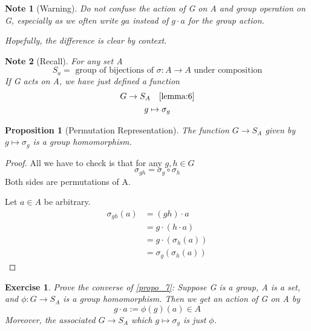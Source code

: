 \documentclass[11pt, oneside]{book}
\theoremstyle{break}
\newtheorem*{proof}{Proof}
\newtheorem{propo}{Proposition}[section]
\newtheorem*{note}{Note}
\newtheorem{ex}{Exercise}[section]
\begin{document}
\begin{note}[Warning]
    Do not confuse the action of G on A and group operation on G, especially as we often write $ga$ instead of $g \cdot a$ for the group action.

    Hopefully, the difference is clear by context.
\end{note}

\begin{note}[Recall]
    For any set A
    \begin{equation}
        S_a = \text{ group of bijections of } \sigma: A \to A \text{ under composition}
    \end{equation}
    If G acts on A, we have just defined a function
    \begin{gather*}
        G \to S_A \quad \text{\autoref{lemma:6}} \\
        g \mapsto \sigma_g
    \end{gather*}
\end{note}

\begin{propo}[Permutation Representation]
    \label{propo_7}
    The function $G \to S_A$ given by $g \mapsto \sigma_g$ is a group homomorphism.
\end{propo}

\begin{proof}
    All we have to check is that for any $g, h \in G$
    \begin{equation}
        \sigma_{gh} = \sigma_g \circ \sigma_h
    \end{equation}
    Both sides are permutations of A.

    Let $a \in A$ be arbitrary.
    \begin{align*}
        \sigma_{gh} (a) &= (gh) \cdot a \\
                        &= g\cdot (h \cdot a) \\
                        &= g\cdot (\sigma_h (a)) \\
                        &= \sigma_g (\sigma_h (a))
    \end{align*}
\end{proof}

\begin{ex}
    Prove the converse of \autoref{propo_7}: Suppose G is a group, A is a set, and $\phi : G \to S_A$ is a group homomorphism. Then we get an action of G on A by
    \begin{equation}
        g \cdot a := \phi(g)(a) \in A
    \end{equation}
    Moreover, the associated $G \to S_A$ which $g \mapsto \sigma_g$ is just $\phi$.
\end{ex}
\end{document}

